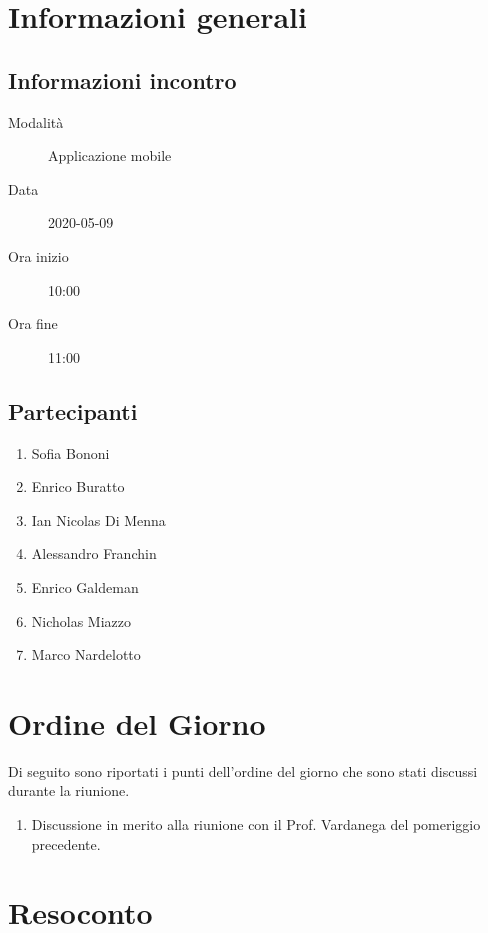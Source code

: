 \documentclass{article}
\begin{document}


\section{Informazioni generali}%
\label{sec:informazioni_generali}

\subsection{Informazioni incontro}%
\label{sub:informazioni_incontro}

\begin{description}
  \item[Modalità] Applicazione mobile 
  \item[Data] 2020-05-09
  \item[Ora inizio] 10:00
  \item[Ora fine] 11:00
\end{description}

\subsection{Partecipanti}%
\label{sub:partecipanti}

\begin{enumerate}
  \item Sofia Bononi
  \item Enrico Buratto
  \item Ian Nicolas Di Menna
  \item Alessandro Franchin
  \item Enrico Galdeman
  \item Nicholas Miazzo
  \item Marco Nardelotto
\end{enumerate}

\section{Ordine del Giorno}%
\label{ordine_del_giorno}
Di seguito sono riportati i punti dell'ordine del giorno che sono stati discussi durante la riunione.
\begin{enumerate}
  \item Discussione in merito alla riunione con il Prof. Vardanega del pomeriggio precedente.
\end{enumerate}

\section{Resoconto}%
\label{resoconto}
\end{document}
